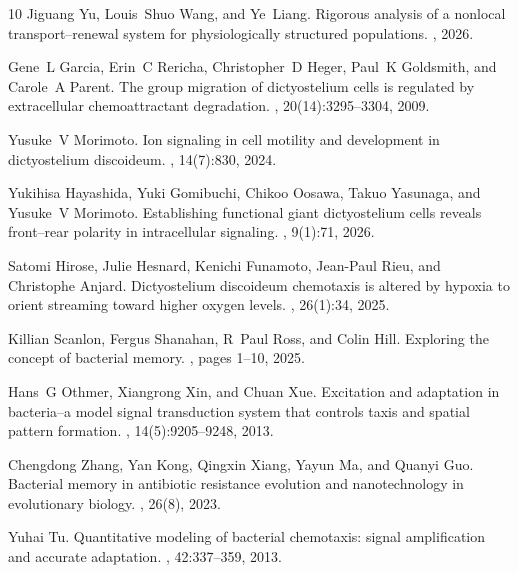 \documentclass[pdflatex,sn-mathphys-num]{sn-jnl}%
\theoremstyle{thmstyleone}
\theoremstyle{thmstyletwo}
\theoremstyle{thmstylethree}
\begin{document}
\begin{thebibliography}{10}
Jiguang Yu, Louis~Shuo Wang, and Ye~Liang.
\newblock Rigorous analysis of a nonlocal transport--renewal system for physiologically structured populations.
, 2026.

Gene~L Garcia, Erin~C Rericha, Christopher~D Heger, Paul~K Goldsmith, and Carole~A Parent.
\newblock The group migration of dictyostelium cells is regulated by extracellular chemoattractant degradation.
, 20(14):3295--3304, 2009.

Yusuke~V Morimoto.
\newblock Ion signaling in cell motility and development in dictyostelium discoideum.
, 14(7):830, 2024.

Yukihisa Hayashida, Yuki Gomibuchi, Chikoo Oosawa, Takuo Yasunaga, and Yusuke~V Morimoto.
\newblock Establishing functional giant dictyostelium cells reveals front--rear polarity in intracellular signaling.
, 9(1):71, 2026.

Satomi Hirose, Julie Hesnard, Kenichi Funamoto, Jean-Paul Rieu, and Christophe Anjard.
\newblock Dictyostelium discoideum chemotaxis is altered by hypoxia to orient streaming toward higher oxygen levels.
, 26(1):34, 2025.

Killian Scanlon, Fergus Shanahan, R~Paul Ross, and Colin Hill.
\newblock Exploring the concept of bacterial memory.
, pages 1--10, 2025.

Hans~G Othmer, Xiangrong Xin, and Chuan Xue.
\newblock Excitation and adaptation in bacteria--a model signal transduction system that controls taxis and spatial pattern formation.
, 14(5):9205--9248, 2013.

Chengdong Zhang, Yan Kong, Qingxin Xiang, Yayun Ma, and Quanyi Guo.
\newblock Bacterial memory in antibiotic resistance evolution and nanotechnology in evolutionary biology.
, 26(8), 2023.

Yuhai Tu.
\newblock Quantitative modeling of bacterial chemotaxis: signal amplification and accurate adaptation.
, 42:337--359, 2013.


\end{thebibliography}
\end{document}
